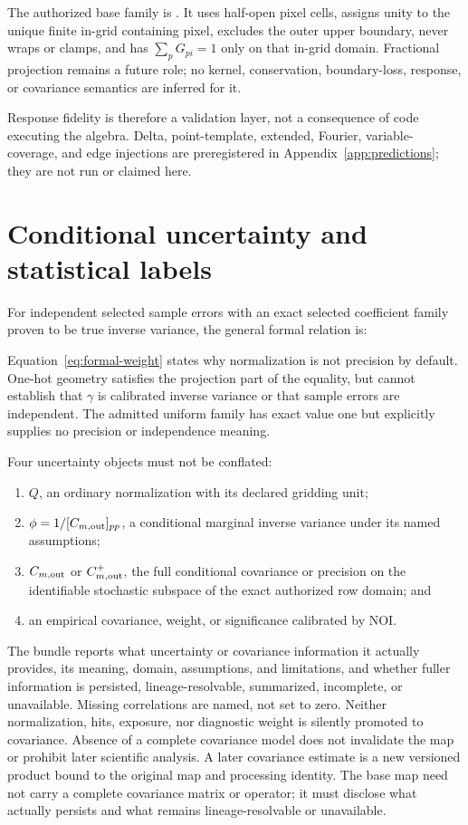 \documentclass[10pt]{article}
\begin{document}
The authorized base family is
\SCIMapOneHotProfile. It uses half-open pixel cells,
assigns unity to the unique finite in-grid containing pixel, excludes the
outer upper boundary, never wraps or clamps, and has \(\sum_pG_{pi}=1\) only
on that in-grid domain. Fractional projection remains a future role; no
kernel, conservation, boundary-loss, response, or covariance semantics are
inferred for it.

Response fidelity is therefore a validation layer, not a consequence of code
executing the algebra. Delta, point-template, extended, Fourier, variable-
coverage, and edge injections are preregistered in Appendix~\ref{app:predictions};
they are not run or claimed here.

\clearpage
\section{Conditional uncertainty and statistical labels}

For independent selected sample errors with an exact selected coefficient
family proven to be true inverse variance, the general formal relation is:

\SCIMapFormalWeightEquations

Equation~\eqref{eq:formal-weight} states why normalization is not precision by
default. One-hot geometry satisfies the projection part of the equality, but
cannot establish that \(\gamma\) is calibrated inverse variance or that sample
errors are independent. The admitted uniform family has exact value one but
explicitly supplies no precision or independence meaning.

Four uncertainty objects must not be conflated:

\begin{enumerate}
\item \(Q\), an ordinary normalization with its declared gridding unit;
\item \(\phi=1/[C_{m,{\rm out}}]_{pp}\), a conditional marginal inverse
variance under
its named assumptions;
\item \(C_{m,{\rm out}}\) or \(C_{m,{\rm out}}^+\), the full conditional
covariance or precision on the identifiable stochastic subspace of the exact
authorized row domain; and
\item an empirical covariance, weight, or significance calibrated by NOI.
\end{enumerate}

The bundle reports what uncertainty or covariance information it actually
provides, its meaning, domain, assumptions, and limitations, and whether fuller
information is persisted, lineage-resolvable, summarized, incomplete, or
unavailable. Missing correlations are named, not set to zero. Neither
normalization, hits, exposure, nor diagnostic weight is silently promoted to
covariance. Absence of a complete covariance model does not invalidate the map
or prohibit later scientific analysis. A later covariance estimate is a new
versioned product bound to the original map and processing identity. The base
map need not carry a complete covariance matrix or operator; it must disclose
what actually persists and what remains lineage-resolvable or unavailable.
\end{document}
